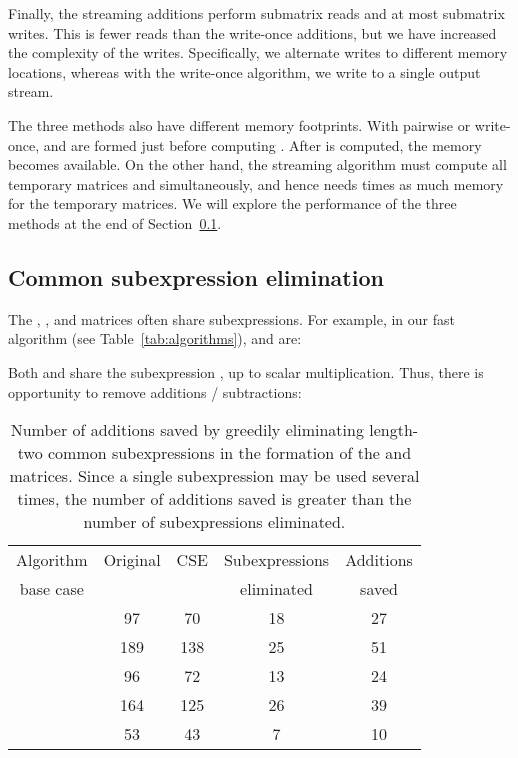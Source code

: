 \documentclass[preprint]{sigplanconf}
\begin{document}
Finally, the streaming additions perform  submatrix reads and at most  submatrix writes.
This is fewer reads than the write-once additions, but we have increased the complexity of the writes.
Specifically, we alternate writes to different memory locations, whereas with the write-once algorithm, we write to a single output stream.


The three methods also have different memory footprints.
With pairwise or write-once,  and  are formed just before computing .
After  is computed, the memory becomes available.
On the other hand, the streaming algorithm must compute all temporary matrices  and  simultaneously,
and hence needs  times as much memory for the temporary matrices.
We will explore the performance of the three methods at the end of Section~\ref{sec:cse}.

\subsection{Common subexpression elimination}
\label{sec:cse}

The , , and  matrices often share subexpressions.
For example, in our  fast algorithm (see Table~\ref{tab:algorithms}),
 and  are:


Both  and  share the subexpression , up to scalar multiplication.
Thus, there is opportunity to remove additions / subtractions:


\begin{table}[tb]
\centering
\caption{
Number of additions saved by greedily eliminating length-two common subexpressions in the formation of
the  and  matrices.
Since a single subexpression may be used several times, the number of additions saved is greater than the
number of subexpressions eliminated.
}
\begin{tabular}{c c c c c}
\toprule
Algorithm   & Original & CSE & Subexpressions & Additions \\
base case  &              &                 & eliminated & saved \\ \midrule
   & 97 & 70 & 18 & 27\\
   & 189 & 138 & 25 & 51\\
   & 96 & 72 & 13 & 24\\
   & 164 & 125 & 26 & 39\\
   & 53 & 43 & 7 & 10 \\
\bottomrule
\end{tabular}
\label{tab:cse}
\end{table}
\end{document}
